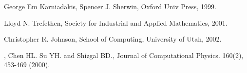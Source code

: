 

\begin{thebibliography}{9}

        George Em Karniadakis, Spencer J. Sherwin, \/
        Oxford Univ Press, 1999.

        Lloyd N. Trefethen, \/
        Society for Industrial and Applied Mathematics, 2001.

        Christopher R. Johnson, \/
        School of Computing, University of Utah, 2002.


,
        Chen HL. Su YH. and Shizgal BD., \/
        Journal of Computational Physics. 160(2), 453-469 (2000).


\end{thebibliography}
